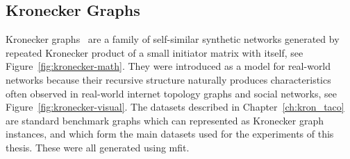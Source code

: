 \subsection{Kronecker Graphs}
Kronecker graphs~\cite{kronecker} are a family of self-similar synthetic networks
generated by repeated Kronecker product of a small initiator matrix with itself, see Figure~\ref{fig:kronecker-math}. They
were introduced as a model for real-world networks because their recursive structure
naturally produces characteristics often observed
in real-world internet topology graphs and social networks, see Figure~\ref{fig:kronecker-visual}. The datasets described in Chapter~\ref{ch:kron_taco}
are standard benchmark graphs which can represented as Kronecker graph instances, and which form the main datasets used for the experiments of this thesis.
These were all generated using mfit. \cite{moez}

\newcommand{\kia}{1}\newcommand{\kib}{1}
\newcommand{\kic}{1}\newcommand{\kid}{0}

\newcommand{\kronmatrix}[2]{%
  \pgfmathtruncatemacro{\kN}{2^#1}%
  \pgfmathtruncatemacro{\kLast}{\kN-1}%
  \pgfmathtruncatemacro{\kTop}{#1-1}%
  \foreach \i in {0,...,\kLast}{%
    \foreach \j in {0,...,\kLast}{%
      \xdef\kflag{1}%
      \foreach \l in {0,...,\kTop}{%
        \pgfmathtruncatemacro{\kx}{mod(floor(\i/2^\l),2)}%
        \pgfmathtruncatemacro{\ky}{mod(floor(\j/2^\l),2)}%
        \pgfmathtruncatemacro{\kv}{ifthenelse(\kx==0,ifthenelse(\ky==0,\kia,\kib),ifthenelse(\ky==0,\kic,\kid))}%
        \pgfmathtruncatemacro{\knew}{\kflag*\kv}%
        \xdef\kflag{\knew}%
      }%
      \ifnum\kflag=1
        \fill[black!70] (\j*#2,-\i*#2) rectangle ++(#2,-#2);
      \fi
    }%
  }%
  \draw[black!35,very thin] (0,0) grid[step=#2] (\kN*#2,-\kN*#2);%
  \draw[thick] (0,0) rectangle (\kN*#2,-\kN*#2);%
  \ifnum#1>1
    \draw[thick] (\kN*#2/2,0) -- (\kN*#2/2,-\kN*#2) (0,-\kN*#2/2) -- (\kN*#2,-\kN*#2/2);%
  \fi
}

